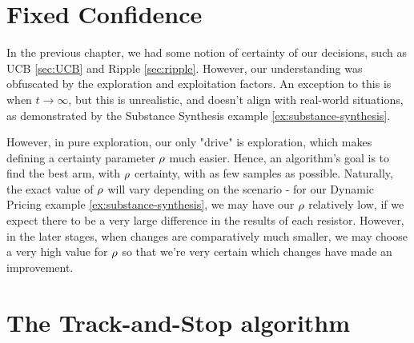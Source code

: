 
\section{Fixed Confidence}
\label{sec:fixedconfidence}


In the previous chapter, we had some notion of certainty of our decisions, such as UCB \ref{sec:UCB} and Ripple \ref{sec:ripple}. However, our understanding was obfuscated by the exploration and exploitation factors. An exception to this is when $t \rightarrow \infty$, but this is unrealistic, and doesn't align with real-world situations, as demonstrated by the Substance Synthesis example \ref{ex:substance-synthesis}.

However, in pure exploration, our only "drive" is exploration, which makes defining a certainty parameter $\rho$ much easier. Hence, an algorithm's goal is to find the best arm, with $\rho$ certainty, with as few samples as possible. Naturally, the exact value of $\rho$ will vary depending on the scenario - for our Dynamic Pricing example \ref{ex:substance-synthesis}, we may have our $\rho$ relatively low, if we expect there to be a very large difference in the results of each resistor. However, in the later stages, when changes are comparatively much smaller, we may choose a very high value for $\rho$ so that we're very certain which changes have made an improvement.

\section{The Track-and-Stop algorithm}
\label{sec:trackandstop}
